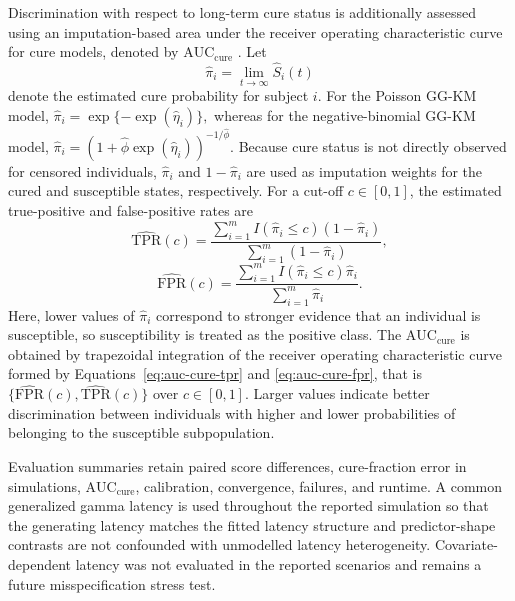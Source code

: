 Discrimination with respect to long-term cure status is additionally
assessed using an imputation-based area under the receiver operating
characteristic curve for cure models, denoted by
$\mathrm{AUC}_{\mathrm{cure}}$ \cite{medina2024}. Let
\begin{equation}
	\widehat\pi_i
	=
	\lim_{t\to\infty}
	\widehat S_i(t)
\end{equation}
denote the estimated cure probability for subject $i$. For the Poisson
GG-KM model,
$
\widehat\pi_i
=
\exp\{-\exp(\widehat\eta_i)\},
$
whereas for the negative-binomial GG-KM model,
$
\widehat\pi_i
=
\left(
1+\widehat\phi\exp(\widehat\eta_i)
\right)^{-1/\widehat\phi}
$.
Because cure status is not directly observed for censored individuals,
$\widehat\pi_i$ and $1-\widehat\pi_i$ are used as imputation weights for
the cured and susceptible states, respectively. For a cut-off
$c\in[0,1]$, the estimated true-positive and false-positive rates are
\begin{equation}
	\widehat{\mathrm{TPR}}(c)
	=
	\frac{
		\displaystyle
		\sum_{i=1}^{m}
		I(\widehat\pi_i\leq c)
		(1-\widehat\pi_i)
	}{
		\displaystyle
		\sum_{i=1}^{m}
		(1-\widehat\pi_i)
	},
	\label{eq:auc-cure-tpr}
\end{equation}
\begin{equation}
	\widehat{\mathrm{FPR}}(c)
	=
	\frac{
		\displaystyle
		\sum_{i=1}^{m}
		I(\widehat\pi_i\leq c)
		\widehat\pi_i
	}{
		\displaystyle
		\sum_{i=1}^{m}
		\widehat\pi_i
	}.
	\label{eq:auc-cure-fpr}
\end{equation}
Here, lower values of $\widehat\pi_i$ correspond to stronger evidence
that an individual is susceptible, so susceptibility is treated as the
positive class. The $\mathrm{AUC}_{\mathrm{cure}}$ is obtained by
trapezoidal integration of the receiver operating characteristic curve
formed by Equations~\eqref{eq:auc-cure-tpr} and \eqref{eq:auc-cure-fpr}, that is
		$\{\widehat{\mathrm{FPR}}(c),\widehat{\mathrm{TPR}}(c)\}$
over $c\in[0,1]$. Larger values indicate better discrimination between
individuals with higher and lower probabilities of belonging to the
susceptible subpopulation.

Evaluation summaries retain paired score differences, cure-fraction
error in simulations, $\mathrm{AUC}_{\mathrm{cure}}$, calibration,
convergence, failures, and runtime. A common generalized gamma latency
is used throughout the reported simulation so that the generating
latency matches the fitted latency structure and predictor-shape
contrasts are not confounded with unmodelled latency heterogeneity.
Covariate-dependent latency was not evaluated in the reported scenarios
and remains a future misspecification stress test.

